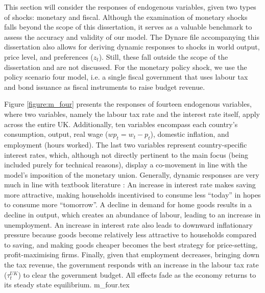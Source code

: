 This section will consider the responses of endogenous variables, given two types of shocks: monetary and fiscal. Although the examination of monetary shocks falls beyond the scope of this dissertation, it serves as a valuable benchmark to assess the accuracy and validity of our model. The Dynare file accompanying this dissertation also allows for deriving dynamic responses to shocks in world output, price level, and preferences ($z_t$). Still, these fall outside the scope of the dissertation and are not discussed. For the monetary policy shock, we use the policy scenario four model, i.e. a single fiscal government that uses labour tax and bond issuance as fiscal instruments to raise budget revenue.

Figure \ref{figure:m_four} presents the responses of fourteen endogenous variables, where two variables, namely the labour tax rate and the interest rate itself, apply across the entire UK. Additionally, ten variables encompass each country's consumption, output, real wage ($wp_t = w_t - p_t$), domestic inflation, and employment (hours worked). The last two variables represent country-specific interest rates, which, although not directly pertinent to the main focus (being included purely for technical reasons), display a co-movement in line with the model's imposition of the monetary union. Generally, dynamic responses are very much in line with textbook literature \textcolor{red}{\parencite{jordigal_2015_monetary}}: An increase in interest rate makes saving more attractive, making households incentivised to consume less ``today'' in hopes to consume more ``tomorrow''. A decline in demand for home goods results in a decline in output, which creates an abundance of labour, leading to an increase in unemployment. An increase in interest rate also leads to downward inflationary pressure because goods become relatively less attractive to households compared to saving, and making goods cheaper becomes the best strategy for price-setting, profit-maximising firms. Finally, given that employment decreases, bringing down the tax revenue, the government responds with an increase in the labour tax rate ($\tau^{UK}_t$) to clear the government budget. All effects fade as the economy returns to its steady state equilibrium.
{m_four.tex}

